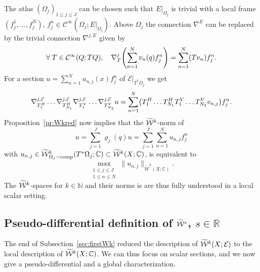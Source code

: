 \documentclass[10pt]{amsart}
\theoremstyle{definition}\newtheorem{defi}[theo]{Definition}\newtheorem{rema}[theo]{Remark}\newtheorem{exam}[theo]{Example}\newtheorem{exem}[theo]{Example}\newtheorem{nota}[theo]{Notation}
\newcommand{\C}{\mathbb{C}}
\newcommand{\R}{\mathbb{R}}
\newcommand{\N}{\mathbb{N}}
\newcommand{\clW}{\mathcal{W}}
\newcommand{\clC}{\mathcal{C}}
\newcommand{\clE}{\mathcal{E}}
\DeclareMathOperator{\ccomp}{comp}
\let\oldtilde\tilde
\renewcommand*{\tilde}[1]{\mathchoice{\widetilde{#1}}{\widetilde{#1}}{\oldtilde{#1}}{\oldtilde{#1}}}
\let\oldforall\forall
\renewcommand*{\forall}{\mathrel{\oldforall}}
\let\originalleft\left
\let\originalright\right
\renewcommand{\left}{\mathopen{}\mathclose\bgroup\originalleft}
\renewcommand{\right}{\aftergroup\egroup\originalright}
\begin{document}
The atlas $(\Omega_{j})_{1\leq j\leq J}$ can be chosen such that $E|_{\Omega_{j}}$ is trivial with a local frame $(f_{j}^{1},\dots,f_{j}^{N})$, $f_{j}^{n}\in \clC^{\infty}(\Omega_{j};E|_{\Omega_{j}})$. Above $\Omega_{j}$ the connection $\nabla^{E}$ can be replaced by the trivial connection $\nabla^{j,E}$ given by
\[
\forall T\in \clC^{\infty}(Q;TQ),\quad \nabla^{j}_{T}\left(\sum_{n=1}^{N}v_{n}(q)f_{j}^{n}\right)=\sum_{n=1}^{N}(Tv_{n})f_{j}^{n}.
\]
For a section $u=\sum_{n=1}^{N}u_{n,j}(x)f_{j}^{n}$ of $\clE|_{T^{*}\Omega_{j}}$ we get
\[
\nabla^{j,\clE}_{T_{1}^{H}}\dots \nabla^{j,\clE}_{T_{N_{1}}^{H}}
\nabla^{j,\clE}_{T_{1}^{V}}\dots \nabla^{j,\clE}_{T_{N_{2}}^{V}}u=
\sum_{n=1}^{N}\left(T_{1}^{H}\dots T_{N_{1}}^{H}T_{1}^{V}\dots T_{N_{2}}^{V}v_{n,j}\right)f^{n}_{j}.
\]
Proposition~\ref{pr:Wkred} now implies that the $\tilde{\clW}^{k}$-norm of
\[
u=\sum_{j=1}^{J}\varrho_{j}(q)u=\sum_{j=1}^{J}\sum_{n=1}^{N}u_{n,j}f^{n}_{j}
\]
with $u_{n,j}\in \tilde{\clW}^{k}_{\Omega_{j}-\ccomp}(T^{*}\Omega_{j};\C)\subset \tilde{\clW}^{k}(X;\C)$, is equivalent to
\[
\max_{\substack{1\leq j\leq J\\ 1\leq n\leq N}}\|u_{n,j}\|_{\widetilde{\clW}^{k}(X;\C)}.
\]
The $\tilde{\clW}^{k}$-spaces for $k\in \N$ and their norms is are thus fully understood in a local scalar setting.

\subsection{Pseudo-differential definition of \texorpdfstring{$\tilde{\clW}^{s}$}{W\^s}, \texorpdfstring{$s\in \R$}{s in R}}\label{sec:pseudWs}

The end of Subsection~\ref{sec:firstWk} reduced the description of $\tilde{\clW}^{k}(X;\clE)$ to the local description of $\tilde{\clW}^{k}(X;\C)$. We can thus focus on scalar sections, and we now give a pseudo-differential and a global characterization.
\end{document}
